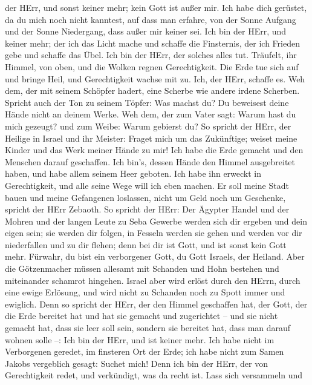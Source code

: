 der HErr, und sonst keiner mehr; kein Gott ist außer mir. Ich habe dich
gerüstet, da du mich noch nicht kanntest,  auf dass man
erfahre, von der Sonne Aufgang und der Sonne Niedergang, dass außer mir
keiner sei. Ich bin der HErr, und keiner mehr;  der ich das
Licht mache und schaffe die Finsternis, der ich Frieden gebe und schaffe
das Übel. Ich bin der HErr, der solches alles tut. 
Träufelt, ihr Himmel, von oben, und die Wolken regnen Gerechtigkeit. Die
Erde tue sich auf und bringe Heil, und Gerechtigkeit wachse mit zu. Ich,
der HErr, schaffe es.  Weh dem, der mit seinem Schöpfer
hadert, eine Scherbe wie andere irdene Scherben. Spricht auch der Ton zu
seinem Töpfer: Was machst du? Du beweisest deine Hände nicht an deinem
Werke.  Weh dem, der zum Vater sagt: Warum hast du mich
gezeugt? und zum Weibe: Warum gebierst du?  So spricht der
HErr, der Heilige in Israel und ihr Meister: Fraget mich um das
Zukünftige; weiset meine Kinder und das Werk meiner Hände zu mir!
 Ich habe die Erde gemacht und den Menschen darauf
geschaffen. Ich bin's, dessen Hände den Himmel ausgebreitet haben, und
habe allem seinem Heer geboten.  Ich habe ihn erweckt in
Gerechtigkeit, und alle seine Wege will ich eben machen. Er soll meine
Stadt bauen und meine Gefangenen loslassen, nicht um Geld noch um
Geschenke, spricht der HErr Zebaoth.  So spricht der HErr:
Der Ägypter Handel und der Mohren und der langen Leute zu Seba Gewerbe
werden sich dir ergeben und dein eigen sein; sie werden dir folgen, in
Fesseln werden sie gehen und werden vor dir niederfallen und zu dir
flehen; denn bei dir ist Gott, und ist sonst kein Gott mehr.
 Fürwahr, du bist ein verborgener Gott, du Gott Israels,
der Heiland.  Aber die Götzenmacher müssen allesamt mit
Schanden und Hohn bestehen und miteinander schamrot hingehen.
 Israel aber wird erlöst durch den HErrn, durch eine ewige
Erlösung, und wird nicht zu Schanden noch zu Spott immer und ewiglich.
 Denn so spricht der HErr, der den Himmel geschaffen hat,
der Gott, der die Erde bereitet hat und hat sie gemacht und zugerichtet
-- und sie nicht gemacht hat, dass sie leer soll sein, sondern sie
bereitet hat, dass man darauf wohnen solle --: Ich bin der HErr, und ist
keiner mehr.  Ich habe nicht im Verborgenen geredet, im
finsteren Ort der Erde; ich habe nicht zum Samen Jakobs vergeblich
gesagt: Suchet mich! Denn ich bin der HErr, der von Gerechtigkeit redet,
und verkündigt, was da recht ist.  Lass sich versammeln und
